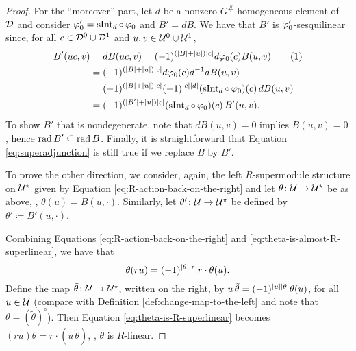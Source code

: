\begin{proof}
    For the ``moreover'' part, let $d$ be a nonzero $G^\#$-homogeneous element of $\mathcal{D}$ and consider $\varphi_0' = \operatorname{sInt}_d \circ \, \varphi_0$ and $B' = dB$. 
    We have that $B'$ is $\varphi_0'$-sesquilinear since, for all $c\in \mathcal{D}^{\bar0} \cup \mathcal{D}^{\bar1}$ and $u,v \in \mathcal U^{\bar0} \cup \mathcal U^{\bar1}$,
    \begin{align*}
        B' (uc, v) &= dB (uc, v) = (-1)^{(|B| + |u| ) |c|} d\vphi_0(c) B(u,v) \addtocounter{equation}{1}\tag{\theequation}\label{eq:dB-is-sesquilinear}\\
        &= (-1)^{(|B| + |u| ) |c|} d\vphi_0(c) d\inv d B(u,v) \\
        &=  (-1)^{(|B| + |u| ) |c|} \sign{c}{d} (\operatorname{sInt}_d \circ\, \vphi_0) (c)\, dB(u,v)\\
        &= (-1)^{(|B'| + |u|) |c|} (\operatorname{sInt}_d \circ\, \vphi_0) (c)\, B'(u,v).
    \end{align*}
    To show $B'$ that is nondegenerate, note that $dB(u,v) = 0$ implies $B(u,v) =0$, hence  $\operatorname{rad} B' \subseteq \operatorname{rad} B$. 
    Finally, it is straightforward that Equation \eqref{eq:superadjunction} is still true if we replace $B$ by $B'$. 
    
    
    To prove the other direction, we consider, again, the left $R$-supermodule structure on $\mathcal U^\star$ given by Equation \eqref{eq:R-action-back-on-the-right} and let $\theta\colon \mathcal U \to \mathcal U^\star$ be as above, \ie, $\theta(u) = B(u, \cdot)$. Similarly, let $\theta'\colon \mathcal U \to \mathcal U^\star$ be defined by $\theta' \coloneqq B'(u, \cdot)$.
    
    Combining Equations \eqref{eq:R-action-back-on-the-right} and  \eqref{eq:theta-is-almost-R-superlinear}, we have that
    \begin{equation}\label{eq:theta-is-R-superlinear}
        \theta(ru) = (-1)^{|\theta||r|} r\cdot \theta(u).
    \end{equation}
    Define the map $\tilde \theta\colon \mathcal U \to \mathcal U^\star$, written on the right, by $u\, \tilde\theta = (-1)^{|u||\theta|} \theta(u)$, for all $u\in \mathcal U$ (compare with Definition \ref{def:change-map-to-the-left} and note that $\theta = (\tilde \theta)^\circ$). 
    Then Equation \eqref{eq:theta-is-R-superlinear} becomes $(ru)\tilde\theta = r \cdot (u\,\tilde\theta)$, \ie, $\tilde\theta$ is $R$-linear.
    

\end{proof}

